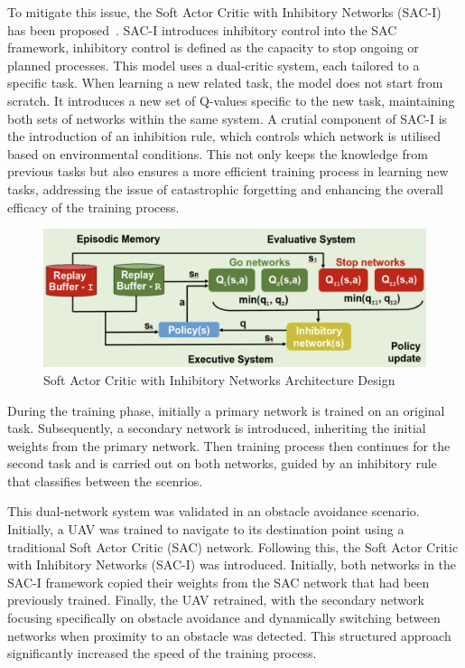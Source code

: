 To mitigate this issue, the Soft Actor Critic with Inhibitory Networks (SAC-I) has been proposed~\cite{fyp10-sac-Inhibitory}.
SAC-I introduces inhibitory control into the SAC framework, inhibitory control is defined as the capacity to stop ongoing or planned processes.
This model uses a dual-critic system, each tailored to a specific task.
When learning a new related task, the model does not start from scratch.
It introduces a new set of Q-values specific to the new task, maintaining both sets of networks within the same system. 
A crutial component of SAC-I is the introduction of an inhibition rule, which controls which network is utilised based on environmental conditions.
This not only keeps the knowledge from previous tasks but also ensures a more efficient training process in learning new tasks, addressing the issue of catastrophic forgetting and enhancing the overall efficacy of the training process.

\begin{figure}[htbp]
  \centering
  \includegraphics[width=\textwidth]{background/fyp-10-sac-inhibitors.png}
  \caption{Soft Actor Critic with Inhibitory Networks Architecture Design}
\label{fig:fyp17-sacfd}
\end{figure}

During the training phase, initially a primary network is trained on an original task.
Subsequently, a secondary network is introduced, inheriting the initial weights from the primary network.
Then training process then continues for the second task and is carried out on both networks, guided by an inhibitory rule that classifies between the scenrios.

This dual-network system was validated in an obstacle avoidance scenario.
Initially, a UAV was trained to navigate to its destination point using a traditional Soft Actor Critic (SAC) network. 
Following this, the Soft Actor Critic with Inhibitory Networks (SAC-I) was introduced. 
Initially, both networks in the SAC-I framework copied their weights from the SAC network that had been previously trained. 
Finally, the UAV retrained, with the secondary network focusing specifically on obstacle avoidance and dynamically switching between networks when proximity to an obstacle was detected. 
This structured approach significantly increased the speed of the training process.


